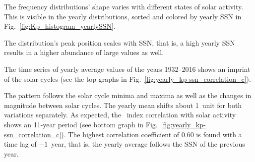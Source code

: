 The \Kp{} frequency distributions' shape varies with different states of solar activity. This is visible in the yearly distributions, sorted and colored by yearly SSN in Fig.~\ref{fig:Kp_histogram_yearlySSN}.
\begin{figure}
\end{figure}
The distribution's peak position scales with SSN, that is, a high yearly SSN results in a higher abundance of large \Kp{} values as well.

The time series of yearly average \Kp{} values of the years 1932--2016 shows an imprint of the solar cycles (see the top graphs in Fig.~\ref{fig:yearly_kp-ssn_correlation_c}).
\begin{figure}
\end{figure}
The \Kp{} pattern follows the solar cycle minima and maxima as well as the changes in magnitude between solar cycles. The yearly mean \Kp{} shifts about 1~unit for both variations separately. As expected, the \Kp{}~index correlation with solar activity shows an 11-year period (see bottom graph in Fig.~\ref{fig:yearly_kp-ssn_correlation_c}). The highest correlation coefficient of 0.60 is found with a time lag of $-1$~year, that is, the yearly average \Kp{} follows the SSN of the previous year.

